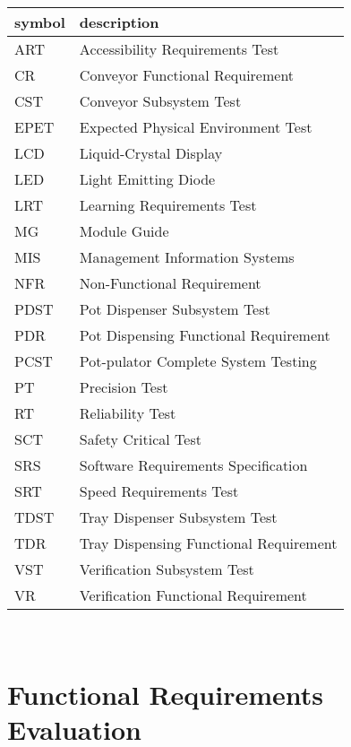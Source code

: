 \documentclass[12pt, titlepage]{article}
\begin{document}
\renewcommand{\arraystretch}{1.2}
\begin{tabular}{l l} 
  \toprule		
  \textbf{symbol} & \textbf{description}\\
  \midrule 
  ART & Accessibility Requirements Test\\
CR & Conveyor Functional Requirement\\
CST & Conveyor Subsystem Test\\
EPET & Expected Physical Environment Test\\
LCD & Liquid-Crystal Display\\
LED & Light Emitting Diode\\
LRT & Learning Requirements Test\\
MG & Module Guide\\
MIS & Management Information Systems\\
NFR & Non-Functional Requirement\\
PDST & Pot Dispenser Subsystem Test\\
PDR & Pot Dispensing Functional Requirement\\
PCST & Pot-pulator Complete System Testing\\
PT & Precision Test\\
RT & Reliability Test\\
SCT & Safety Critical Test\\
SRS & Software Requirements Specification\\
SRT & Speed Requirements Test\\
TDST & Tray Dispenser Subsystem Test\\
TDR & Tray Dispensing Functional Requirement\\
VST & Verification Subsystem Test\\
VR & Verification Functional Requirement\\
  \bottomrule
\end{tabular}\\

\newpage

\tableofcontents

\listoftables %


\newpage


\section{Functional Requirements Evaluation}
\end{document}
